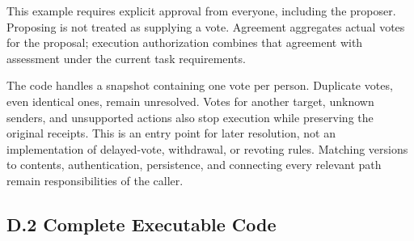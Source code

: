 \documentclass[10pt,a4paper]{article}
\begin{document}
This example requires explicit approval from everyone, including the proposer. Proposing is not treated as supplying a vote. Agreement aggregates actual votes for the proposal; execution authorization combines that agreement with assessment under the current task requirements.

The code handles a snapshot containing one vote per person. Duplicate votes, even identical ones, remain unresolved. Votes for another target, unknown senders, and unsupported actions also stop execution while preserving the original receipts. This is an entry point for later resolution, not an implementation of delayed-vote, withdrawal, or revoting rules. Matching versions to contents, authentication, persistence, and connecting every relevant path remain responsibilities of the caller.

\subsection{D.2 Complete Executable Code}\label{two-role-failure-design-d.2-complete-executable-code}
\end{document}
